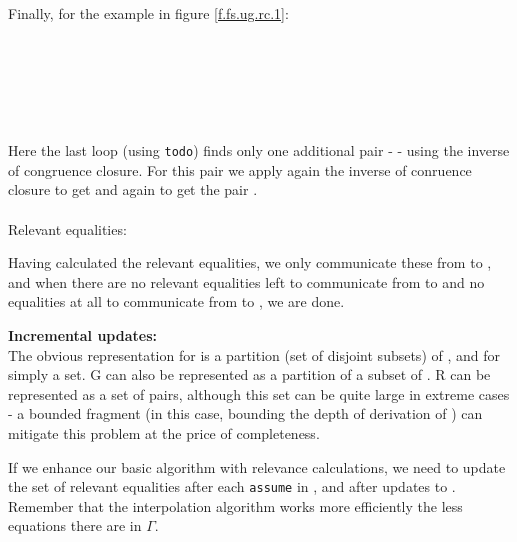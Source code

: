 \bigskip

\noindent
Finally, for the example in figure \ref{f.fs.ug.rc.1}:\\
\\
\\
\\
\\
\\
\\
Here the last loop (using \lstinline|todo|) finds only one additional pair - \m{([\textcolor{red}{y_0}],[\textcolor{red}{y_1}])} - 
using the inverse of congruence closure. For this pair we apply again the inverse of conruence closure to get \m{([\textcolor{red}{z_0}],[\textcolor{red}{z_1}])} and again to get the pair \m{([a],[b])}.\\
\\
Relevant equalities:\\
\s{[a]=[b]}

Having calculated the relevant equalities, we only communicate these from  to , and when there are no relevant equalities left to communicate from  to  and no equalities at all to communicate from  to , we are done.

\textbf{Incremental updates:}\\
The obvious representation for \eqg{} is a partition (set of disjoint subsets) of , and for  simply a set.
G can also be represented as a partition of a subset of  .
R can be represented as a set of pairs, although this set can be quite large in extreme cases - a bounded fragment (in this case, bounding the depth of derivation of \eqg) can mitigate this problem at the price of completeness.

If we enhance our basic algorithm with relevance calculations, we need to update the set of relevant equalities after each \lstinline|assume| in , and after updates to \m{\Gamma}.
Remember that the interpolation algorithm works more efficiently the less equations there are in $\Gamma$.


